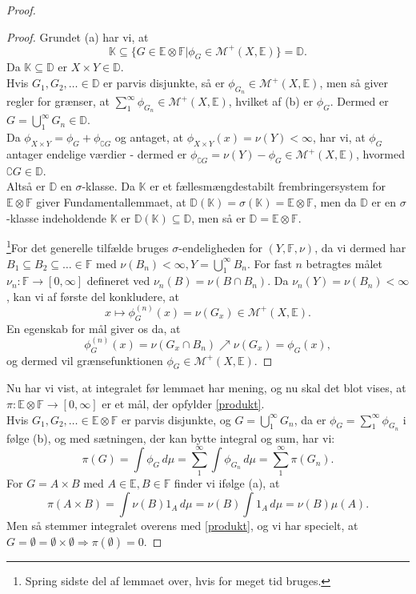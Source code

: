 \documentclass[12pt]{report}
\theoremstyle{break}
\newtheorem*{proof}{Bevis}
\theoremstyle{break}
\newcommand{\Int}[1]{\int#1\,d\mu}
\newcommand{\EE}{\mathbb{E}}
\newcommand{\FF}{\mathbb{F}}
\newcommand{\M}{\mathcal{M}^+}
\newcommand{\K}{\mathbb{K}}
\newcommand{\D}{\mathbb{D}}
\begin{document}
\begin{proof}
\begin{proof}
\bigskip

Grundet (a) har vi, at 
\[\K\subseteq\{G\in\EE\otimes\FF\vert\phi_G\in\M(X,\EE)\}=\D.\]
Da $\K\subseteq\D$ er $X\times Y\in\D$.\\
Hvis $G_1,G_2,\ldots\in\D$ er parvis disjunkte, så er $\phi_{G_n}\in\M(X,\EE)$, men så giver regler for grænser, at $\sum_1^\infty\phi_{G_n}\in\M(X,\EE)$, hvilket af (b) er $\phi_G$. Dermed er $G=\bigcup_1^\infty G_n\in\D$.\\
Da $\phi_{X\times Y} = \phi_G + \phi_{\complement G}$ og antaget, at  $\phi_{X\times Y}(x)=\nu(Y)<\infty$, har vi, at $\phi_G$ antager endelige værdier - dermed er $\phi_{\complement G} = \nu(Y)-\phi_G\in\M(X,\EE)$, hvormed $\complement G\in\D$.\\
Altså er $\D$ en $\sigma$-klasse. Da $\K$ er et fællesmængdestabilt frembringersystem for $\EE\otimes\FF$ giver Fundamentallemmaet, at $\D(\K)=\sigma(\K)=\EE\otimes\FF$, men da $\D$ er en $\sigma$-klasse indeholdende $\K$ er $\D(\K)\subseteq\D$, men så er $\D=\EE\otimes\FF$.

\bigskip

\footnote{Spring sidste del af lemmaet over, hvis for meget tid bruges.}For det generelle tilfælde bruges $\sigma$-endeligheden for $(Y,\FF,\nu)$, da vi dermed har $B_1\subseteq B_2\subseteq\ldots\in\FF$ med $\nu(B_n)<\infty, Y=\bigcup_1^\infty B_n$. For fast $n$ betragtes målet $\nu_n\colon\FF\to[0,\infty]$ defineret ved $\nu_n(B)=\nu(B\cap B_n)$. Da $\nu_n(Y)=\nu(B_n)<\infty$, kan vi af første del konkludere, at
\[x\mapsto\phi^{(n)}_G(x)=\nu(G_x)\in\M(X,\EE).\]
En egenskab for mål giver os da, at 
\[\phi^{(n)}_G(x)=\nu(G_x\cap B_n)\nearrow\nu(G_x)=\phi_G(x),\]
og dermed vil grænsefunktionen $\phi_G\in\M(X,\EE).$
\end{proof}
Nu har vi vist, at integralet før lemmaet har mening, og nu skal det blot vises, at $\pi\colon\EE\otimes\FF\to[0,\infty]$ er et mål, der opfylder \eqref{produkt}.\\
Hvis $G_1,G_2,\ldots\in\EE\otimes\FF$ er parvis disjunkte, og $G=\bigcup_1^\infty G_n$, da er $\phi_G=\sum_1^\infty\phi_{G_n}$ i følge (b), og med sætningen, der kan bytte integral og sum, har vi:
\[\pi(G)=\Int{\phi_G}=\sum\limits^\infty_1\Int{\phi_{G_n}}=\sum\limits^\infty_1\pi(G_n).\]
For $G=A\times B$ med $A\in\EE, B\in\FF$ finder vi ifølge (a), at
\[\pi(A\times B)=\Int{\nu(B)1_A}=\nu(B)\Int{1_A}=\nu(B)\mu(A).\]
Men så stemmer integralet overens med \eqref{produkt}, og vi har specielt, at $G=\emptyset=\emptyset\times\emptyset\Rightarrow\pi(\emptyset)=0$.
\end{proof}
\end{document}
